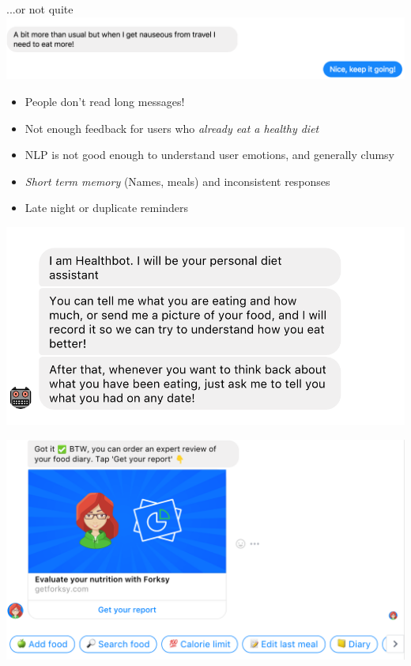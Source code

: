 \documentclass[landscape]{infslides}
\begin{document}
\begin{slide}{...or not quite}
    \includegraphics[scale=0.75]{Nauseous.png}
    \begin{multicols}{2}
    \begin{itemize}\shrinklist
        \item People don't read long messages!  
        \item Not enough feedback for users who \textit{already eat a healthy diet}
        \item NLP is not good enough to understand user emotions, and generally clumsy
        \item \textit{Short term memory} (Names, meals) and inconsistent responses
        \item Late night or duplicate reminders
    \end{itemize}
    \includegraphics{Introduction.png}
    \end{multicols}
\end{slide}
\begin{slide}{}
    \includegraphics[height=0.95\textheight]{Forksy_menu.png}
\end{slide}
\end{document}
